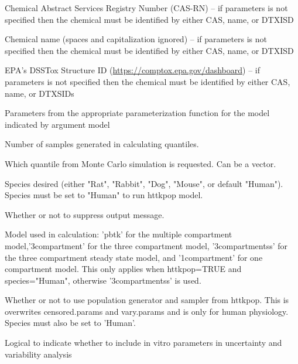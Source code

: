 \documentclass[a4paper]{book}
\begin{document}
\begin{Arguments}
\begin{ldescription}
\item[\code{chem.cas}] Chemical Abstract Services Registry Number (CAS-RN) -- if
parameters is not specified then the chemical must be identified by either
CAS, name, or DTXISD

\item[\code{chem.name}] Chemical name (spaces and capitalization ignored) --  if
parameters is not specified then the chemical must be identified by either
CAS, name, or DTXISD

\item[\code{dtxsid}] EPA's DSSTox Structure ID (\url{https://comptox.epa.gov/dashboard})
-- if parameters is not specified then the chemical must be identified by 
either CAS, name, or DTXSIDs

\item[\code{parameters}] Parameters from the appropriate parameterization function
for the model indicated by argument model

\item[\code{samples}] Number of samples generated in calculating quantiles.

\item[\code{which.quantile}] Which quantile from Monte Carlo simulation is
requested. Can be a vector.

\item[\code{species}] Species desired (either "Rat", "Rabbit", "Dog", "Mouse", or
default "Human").  Species must be set to "Human" to run httkpop model.

\item[\code{suppress.messages}] Whether or not to suppress output message.

\item[\code{model}] Model used in calculation: 'pbtk' for the multiple compartment
model,'3compartment' for the three compartment model, '3compartmentss' for
the three compartment steady state model, and '1compartment' for one
compartment model.  This only applies when httkpop=TRUE and species="Human",
otherwise '3compartmentss' is used.

\item[\code{httkpop}] Whether or not to use population generator and sampler from
httkpop.  This is overwrites censored.params and vary.params and is only for
human physiology.  Species must also be set to 'Human'.

\item[\code{invitrouv}] Logical to indicate whether to include in vitro parameters
in uncertainty and variability analysis


\end{ldescription}
\end{Arguments}
\end{document}
